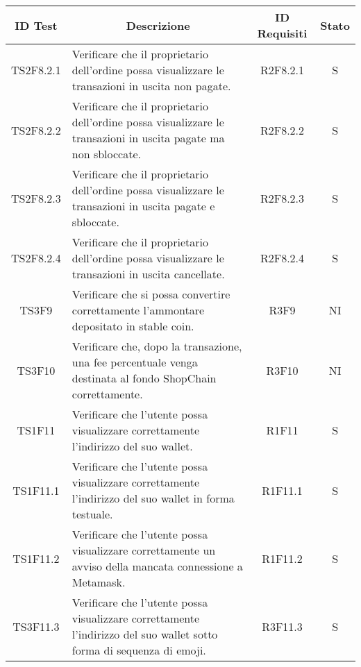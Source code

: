 \begin{table}[H]
  \centering
  \renewcommand{\arraystretch}{1.8}
  \begin{tabular}{c|p{8cm}|c|c}
    \rowcolor[HTML]{125E28}
    \color[HTML]{FFFFFF}\textbf{ID Test}
              & \multicolumn{1}{c}{\color[HTML]{FFFFFF}\textbf{Descrizione}}
              & \color[HTML]{FFFFFF}\textbf{ID Requisiti}
              & \color[HTML]{FFFFFF}\textbf{Stato}                                                                                                          \\
    \hline
    TS2F8.2.1 & Verificare che il proprietario dell'ordine possa visualizzare le transazioni in uscita non pagate.                          & R2F8.2.1 & S \\
    TS2F8.2.2 & Verificare che il proprietario dell'ordine possa visualizzare le transazioni in uscita pagate ma non sbloccate.             & R2F8.2.2 & S \\
    TS2F8.2.3 & Verificare che il proprietario dell'ordine possa visualizzare le transazioni in uscita pagate e sbloccate.                  & R2F8.2.3 & S \\
    TS2F8.2.4 & Verificare che il proprietario dell'ordine possa visualizzare le transazioni in uscita cancellate.                          & R2F8.2.4 & S \\
    TS3F9     & Verificare che si possa convertire correttamente l'ammontare depositato in stable coin\glo{}.                               & R3F9     & NI \\
    TS3F10    & Verificare che, dopo la transazione, una fee percentuale venga destinata al fondo ShopChain correttamente.                  & R3F10    & NI \\
    TS1F11    & Verificare che l'utente possa visualizzare correttamente l'indirizzo del suo wallet\glo{}.                                  & R1F11    & S \\
    TS1F11.1  & Verificare che l'utente possa visualizzare correttamente l'indirizzo del suo wallet\glo{} in forma testuale.                & R1F11.1  & S \\
    TS1F11.2  & Verificare che l'utente possa visualizzare correttamente un avviso della mancata connessione a Metamask\glo{}.              & R1F11.2  & S \\
    TS3F11.3  & Verificare che l'utente possa visualizzare correttamente l'indirizzo del suo wallet\glo{} sotto forma di sequenza di emoji. & R3F11.3  & S \\

\end{tabular}
\end{table}

